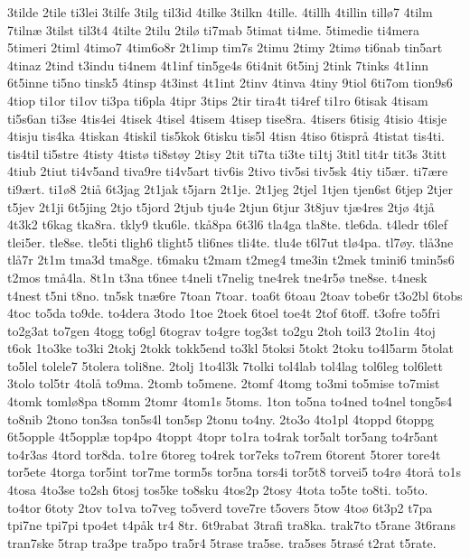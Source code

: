 3tilde
2tile
ti3lei
3tilfe
3tilg
til3id
4tilke
3tilkn
4tille.
4tillh
4tillin
till^^f87
4tilm
7tiln^^e6
3tilst
til3t4
4tilte
2tilu
2til^^f8
ti7mab
5timat
ti4me.
5timedie
ti4mera
5timeri
2timl
4timo7
4tim6o8r
2t1imp
tim7s
2timu
2timy
2tim^^f8
ti6nab
tin5art
4tinaz
2tind
t3indu
ti4nem
4t1inf
tin5ge4s
6ti4nit
6t5inj
2tink
7tinks
4t1inn
6t5inne
ti5no
tinsk5
4tinsp
4t3inst
4t1int
2tinv
4tinva
4tiny
9tiol
6ti7om
tion9s6
4tiop
ti1or
ti1ov
ti3pa
ti6pla
4tipr
3tips
2tir
tira4t
ti4ref
ti1ro
6tisak
4tisam
ti5s6an
ti3se
4tis4ei
4tisek
4tisel
4tisem
4tisep
tise8ra.
4tisers
6tisig
4tisio
4tisje
4tisju
tis4ka
4tiskan
4tiskil
tis5kok
6tisku
tis5l
4tisn
4tiso
6tispr^^e5
4tistat
tis4ti.
tis4til
ti5stre
4tisty
4tist^^f8
ti8st^^f8y
2tisy
2tit
ti7ta
ti3te
ti1tj
3titl
tit4r
tit3s
3titt
4tiub
2tiut
ti4v5and
tiva9re
ti4v5art
tiv6is
2tivo
tiv5si
tiv5sk
4tiy
ti5^^e6r.
ti7^^e6re
ti9^^e6rt.
ti1^^f88
2ti^^e5
6t3jag
2t1jak
t5jarn
2t1je.
2t1jeg
2tjel
1tjen
tjen6st
6tjep
2tjer
t5jev
2t1ji
6t5jing
2tjo
t5jord
2tjub
tju4e
2tjun
6tjur
3t8juv
tj^^e64res
2tj^^f8
4tj^^e5
4t3k2
t6kag
tka8ra.
tkly9
tku6le.
tk^^e58pa
6t3l6
tla4ga
tla8te.
tle6da.
t4ledr
t6lef
tlei5er.
tle8se.
tle5ti
tligh6
tlight5
tli6nes
tli4te.
tlu4e
t6l7ut
tl^^f84pa.
tl7^^f8y.
tl^^e53ne
tl^^e57r
2t1m
tma3d
tma8ge.
t6maku
t2mam
t2meg4
tme3in
t2mek
tmini6
tmin5s6
t2mos
tm^^e54la.
8t1n
t3na
t6nee
t4neli
t7nelig
tne4rek
tne4r5^^f8
tne8se.
t4nesk
t4nest
t5ni
t8no.
tn5sk
tn^^e66re
7toan
7toar.
toa6t
6toau
2toav
tobe6r
t3o2bl
6tobs
4toc
to5da
to9de.
to4dera
3todo
1toe
2toek
6toel
toe4t
2tof
6toff.
t3ofre
to5fri
to2g3at
to7gen
4togg
to6gl
6tograv
to4gre
tog3st
to2gu
2toh
toil3
2to1in
4toj
t6ok
1to3ke
to3ki
2tokj
2tokk
tokk5end
to3kl
5toksi
5tokt
2toku
to4l5arm
5tolat
to5lel
tolele7
5tolera
toli8ne.
2tolj
1to4l3k
7tolki
tol4lab
tol4lag
tol6leg
tol6lett
3tolo
tol5tr
4tol^^e5
to9ma.
2tomb
to5mene.
2tomf
4tomg
to3mi
to5mise
to7mist
4tomk
toml^^f88pa
t8omm
2tomr
4tom1s
5toms.
1ton
to5na
to4ned
to4nel
tong5s4
to8nib
2tono
ton3sa
ton5s4l
ton5sp
2tonu
to4ny.
2to3o
4to1pl
4toppd
6toppg
6t5opple
4t5oppl^^e6
top4po
4toppt
4topr
to1ra
to4rak
tor5alt
tor5ang
to4r5ant
to4r3as
4tord
tor8da.
to1re
6toreg
to4rek
tor7eks
to7rem
6torent
5torer
tore4t
tor5ete
4torga
tor5int
tor7me
torm5s
tor5na
tors4i
tor5t8
torvei5
to4r^^f8
4tor^^e5
to1s
4tosa
4to3se
to2sh
6tosj
tos5ke
to8sku
4tos2p
2tosy
4tota
to5te
to8ti.
to5to.
to4tor
6toty
2tov
to1va
to7veg
to5verd
tove7re
t5overs
5tow
4to^^f8
6t3p2
t7pa
tpi7ne
tpi7pi
tpo4et
t4p^^e5k
tr4
8tr.
6t9rabat
3trafi
tra8ka.
trak7to
t5rane
3t6rans
tran7ske
5trap
tra3pe
tra5po
tra5r4
5trase
tra5se.
tra5ses
5tras^^e9
t2rat
t5rate.
